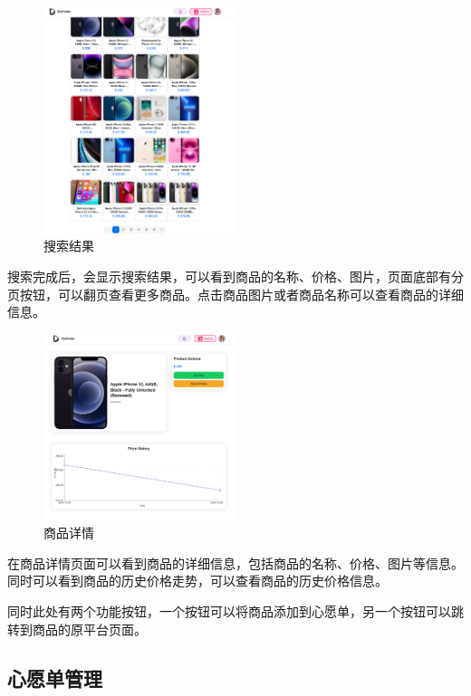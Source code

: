 \begin{figure}[H]
\centering
\includegraphics[width=0.5\textwidth]{assets/report/search_result.png}
\caption{搜索结果}
\end{figure}

搜索完成后，会显示搜索结果，可以看到商品的名称、价格、图片，页面底部有分页按钮，可以翻页查看更多商品。点击商品图片或者商品名称可以查看商品的详细信息。

\begin{figure}[H]
\centering
\includegraphics[width=0.5\textwidth]{assets/report/product_page.png}
\caption{商品详情}
\end{figure}

在商品详情页面可以看到商品的详细信息，包括商品的名称、价格、图片等信息。同时可以看到商品的历史价格走势，可以查看商品的历史价格信息。

同时此处有两个功能按钮，一个按钮可以将商品添加到心愿单，另一个按钮可以跳转到商品的原平台页面。

\subsection{心愿单管理}


